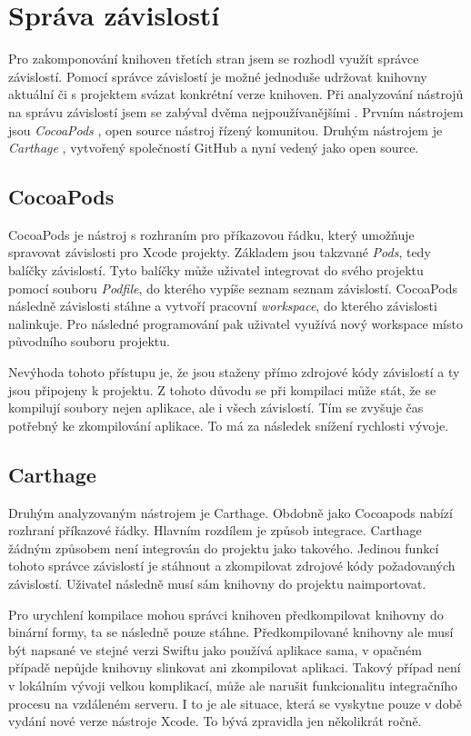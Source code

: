 \section{Správa závislostí}\label{analyza-sprava-zavislosti}

Pro zakomponování knihoven třetích stran jsem se rozhodl využít správce závislostí.
Pomocí správce závislostí je možné jednoduše udržovat knihovny aktuální či s projektem svázat konkrétní verze knihoven.
Při analyzování nástrojů na správu závislostí jsem se zabýval dvěma nejpoužívanějšími \cite{shashikantjagtap-swift-dependency-management}.
Prvním nástrojem jsou \textit{CocoaPods} \cite{cocoapods-about}, open source nástroj řízený komunitou.
Druhým nástrojem je \textit{Carthage} \cite{github-carthage}, vytvořený společností GitHub a nyní vedený jako open source.

\subsection{CocoaPods}

CocoaPods je nástroj s rozhraním pro příkazovou řádku, který umožňuje spravovat závislosti pro Xcode projekty.
Základem jsou takzvané \textit{Pods}, tedy balíčky závislostí.
Tyto balíčky může uživatel integrovat do svého projektu pomocí souboru \textit{Podfile}, do kterého vypíše seznam seznam závislostí.
CocoaPods následně závislosti stáhne a vytvoří pracovní \textit{workspace}, do kterého závislosti nalinkuje.
Pro následné programování pak uživatel využívá nový workspace místo původního souboru projektu.

Nevýhoda tohoto přístupu je, že jsou staženy přímo zdrojové kódy závislostí a ty jsou připojeny k projektu.
Z tohoto důvodu se při kompilaci může stát, že se kompilují soubory nejen aplikace, ale i všech závislostí.
Tím se zvyšuje čas potřebný ke zkompilování aplikace.
To má za následek snížení rychlosti vývoje.

\subsection{Carthage}

Druhým analyzovaným nástrojem je Carthage.
Obdobně jako Cocoapods nabízí rozhraní příkazové řádky.
Hlavním rozdílem je způsob integrace.
Carthage žádným způsobem není integrován do projektu jako takového.
Jedinou funkcí tohoto správce závislostí je stáhnout a zkompilovat zdrojové kódy požadovaných závislostí.
Uživatel následně musí sám knihovny do projektu naimportovat.

Pro urychlení kompilace mohou správci knihoven předkompilovat knihovny do binární formy, ta se následně pouze stáhne.
Předkompilované knihovny ale musí být napsané ve stejné verzi Swiftu jako používá aplikace sama, v opačném případě nepůjde knihovny slinkovat ani zkompilovat aplikaci.
Takový případ není v lokálním vývoji velkou komplikací, může ale narušit funkcionalitu integračního procesu na vzdáleném serveru.
I to je ale situace, která se vyskytne pouze v době vydání nové verze nástroje Xcode.
To bývá zpravidla jen několikrát ročně.
